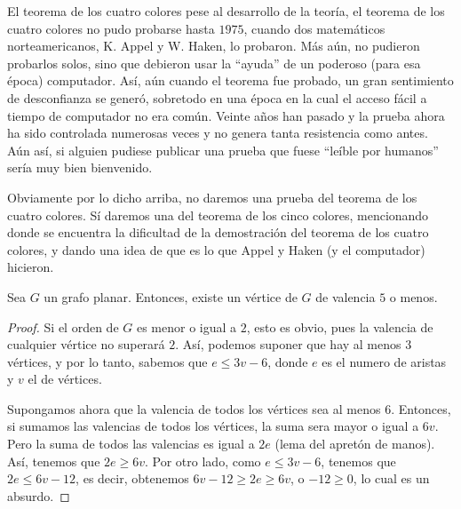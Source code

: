\begin{section}{El teorema de los cuatro colores}
pese al desarrollo de la teoría, el teorema de los cuatro colores
no pudo probarse hasta $1975$, cuando dos matemáticos  norteamericanos, K. Appel y W. Haken, lo
probaron. Más aún, no pudieron probarlos solos, sino que debieron
usar la ``ayuda'' de un poderoso (para esa época) computador. Así,
aún cuando el teorema fue probado, un gran sentimiento de
desconfianza se generó, sobretodo en una época en la cual el
acceso fácil a tiempo de computador no era común. Veinte años han
pasado y la prueba ahora ha sido controlada numerosas veces y no
genera tanta resistencia como antes. Aún así, si alguien pudiese
publicar una prueba que fuese ``leíble por humanos'' sería muy
bien bienvenido.

Obviamente por lo dicho arriba, no daremos una prueba del teorema
de los cuatro colores. Sí daremos una del teorema de los cinco
colores, mencionando donde se encuentra la dificultad de la demostración del teorema de los  cuatro colores, y dando una idea de
que es lo que Appel y Haken (y el computador) hicieron.

\begin{lema} \label{lA4.3.1} Sea $G$ un grafo planar. Entonces, existe
un vértice de $G$ de valencia $5$ o menos.
\end{lema}
\begin{proof} Si el orden de $G$ es menor o igual a $2$, esto
es obvio, pues la valencia de cualquier vértice no superará $2$.
Así, podemos suponer que hay al menos $3$ vértices, y por lo tanto,
sabemos que $e\le 3v-6$, donde $e$ es el numero de aristas y $v$
el de vértices.

Supongamos ahora que la valencia de todos los vértices sea al
menos $6$. Entonces, si sumamos las valencias de todos los vértices,
la suma sera mayor o igual a $6v$. Pero la suma de todos las
valencias es igual a $2e$ (lema del apretón de manos). Así,
tenemos que $2e\ge 6v$. Por otro lado, como $e\le 3v-6$, tenemos
que $2e\le 6v-12$, es decir, obtenemos $6v-12\ge 2e\ge 6v$, o
$-12\ge 0$, lo cual es un absurdo.
\end{proof}


\end{section}
